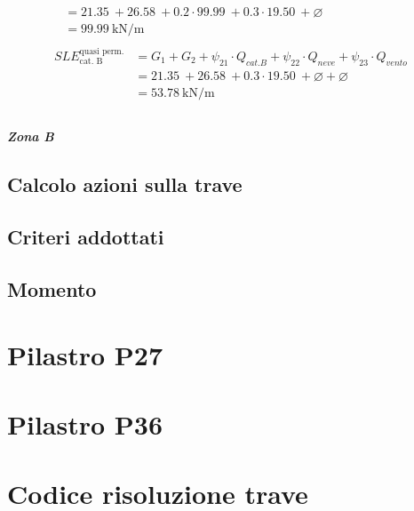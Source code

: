 \begin{align}
\begin{split}
	&= \SI{21.35}{} + \SI{26.58}{} + 0.2\cdot\SI{99.99}{} + 0.3\cdot\SI{19.50}{} + \varnothing\\
	&= \SI{99.99}{\kilo\newton\per\meter}
	\end{split} \\ 
	\begin{split}
	SLE^{\text{quasi perm.}}_{\text{cat. B}} &= G_1 + G_2 + \psi_{21}\cdot Q_{cat. B} + \psi_{22}\cdot Q_{neve} + \psi_{23}\cdot Q_{vento} \\
	&= \SI{21.35}{} + \SI{26.58}{} + 0.3\cdot\SI{19.50}{} + \varnothing + \varnothing \\
	&= \SI{53.78}{\kilo\newton\per\meter}
	\end{split} \\ 
\end{align}
\paragraph*{Zona B}
\section{Calcolo azioni sulla trave}
\section{Criteri addottati}
%

\section{Momento}
\chapter{Pilastro P27}
\chapter{Pilastro P36}



\appendix
\chapter{Codice risoluzione trave}

